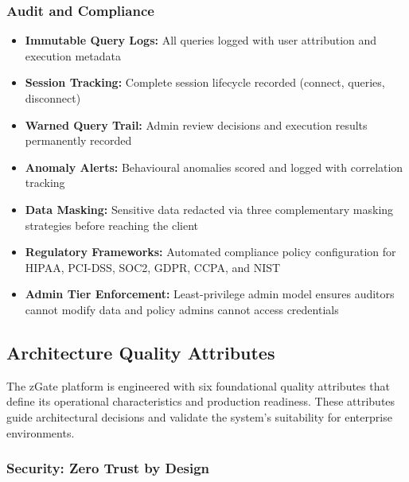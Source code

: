 \subsubsection{Audit and Compliance}

\begin{itemize}[leftmargin=*]
    \item \textbf{Immutable Query Logs:} All queries logged with user attribution and execution metadata
    \item \textbf{Session Tracking:} Complete session lifecycle recorded (connect, queries, disconnect)
    \item \textbf{Warned Query Trail:} Admin review decisions and execution results permanently recorded
    \item \textbf{Anomaly Alerts:} Behavioural anomalies scored and logged with correlation tracking
    \item \textbf{Data Masking:} Sensitive data redacted via three complementary masking strategies before reaching the client
    \item \textbf{Regulatory Frameworks:} Automated compliance policy configuration for HIPAA, PCI-DSS, SOC2, GDPR, CCPA, and NIST
    \item \textbf{Admin Tier Enforcement:} Least-privilege admin model ensures auditors cannot modify data and policy admins cannot access credentials
\end{itemize}

\subsection{Architecture Quality Attributes}

The zGate platform is engineered with six foundational quality attributes that define its operational characteristics and production readiness. These attributes guide architectural decisions and validate the system's suitability for enterprise environments.

\subsubsection{Security: Zero Trust by Design}

